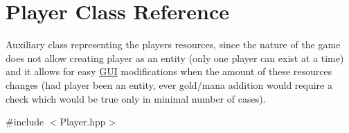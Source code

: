\hypertarget{class_player}{}\section{Player Class Reference}
\label{class_player}


Auxiliary class representing the player\textquotesingle{}s resources, since the nature of the game does not allow creating player as an entity (only one player can exist at a time) and it allows for easy \hyperlink{class_g_u_i}{G\+UI} modifications when the amount of these resources changes (had player been an entity, ever gold/mana addition would require a check which would be true only in minimal number of cases).  




{\ttfamily \#include $<$Player.\+hpp$>$}

